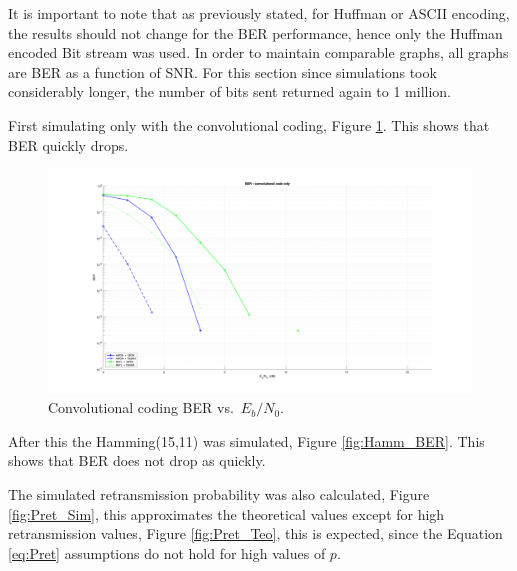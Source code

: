 It is important to note that as previously stated, for Huffman or ASCII encoding, the results should not change for the BER performance, hence only the Huffman encoded Bit stream was used. In order to maintain comparable graphs, all graphs are BER as a function of SNR. For this section since simulations took considerably longer, the number of bits sent returned again to 1 million.

First simulating only with the convolutional coding, Figure \ref{fig:Conv_BER}. This shows that BER quickly drops.

\begin{figure}[H]
  \centering
  \includegraphics[width=0.7\linewidth]{Images/ConvCode.png}
  \caption{Convolutional  coding BER vs.\ $E_b/N_0$.}
  \label{fig:Conv_BER}
\end{figure}

After this the Hamming(15,11) was simulated, Figure \ref{fig:Hamm_BER}. This shows that BER does not drop as quickly.

The simulated retransmission probability was also calculated, Figure \ref{fig:Pret_Sim}, this approximates the theoretical values except for high retransmission values, Figure \ref{fig:Pret_Teo}, this is expected, since the Equation \ref{eq:Pret} assumptions do not hold for high values of $p$.

